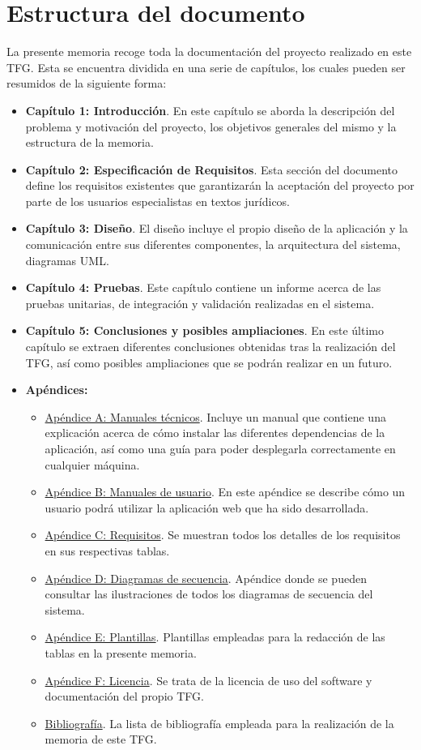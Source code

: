 \section{Estructura del documento}
La presente memoria recoge toda la documentación del proyecto realizado en este TFG. Esta se encuentra dividida en una serie de capítulos, los cuales pueden ser resumidos de la siguiente forma:
\begin{itemize}
\item {\bf Capítulo 1: Introducción}. En este capítulo se aborda la descripción del problema y motivación del proyecto, los objetivos generales del mismo y la estructura de la memoria.
\item {\bf Capítulo 2: Especificación de Requisitos}. Esta sección del documento define los requisitos existentes que garantizarán la aceptación del proyecto por parte de los usuarios especialistas en textos jurídicos.
\item {\bf Capítulo 3: Diseño}. El diseño incluye el propio diseño de la aplicación y la comunicación entre sus diferentes componentes, la arquitectura del sistema, diagramas UML.
\item {\bf Capítulo 4: Pruebas}. Este capítulo contiene un informe acerca de las pruebas unitarias, de integración y validación realizadas en el sistema.
\item {\bf Capítulo 5: Conclusiones y posibles ampliaciones}. En este último capítulo se extraen diferentes conclusiones obtenidas tras la realización del TFG, así como posibles ampliaciones que se podrán realizar en un futuro.
\item {\bf Apéndices:}
\begin{itemize}
\item \underline{Apéndice A: Manuales técnicos}. Incluye un manual que contiene una explicación acerca de cómo instalar las diferentes dependencias de la aplicación, así como una guía para poder desplegarla correctamente en cualquier máquina.
\item \underline{Apéndice B: Manuales de usuario}. En este apéndice se describe cómo un usuario podrá utilizar la aplicación web que ha sido desarrollada.
\item \underline{Apéndice C: Requisitos}. Se muestran todos los detalles de los requisitos en sus respectivas tablas.
\item \underline{Apéndice D: Diagramas de secuencia}. Apéndice donde se pueden consultar las ilustraciones de todos los diagramas de secuencia del sistema.
\item \underline{Apéndice E: Plantillas}. Plantillas empleadas para la redacción de las tablas en la presente memoria.
\item \underline{Apéndice F: Licencia}. Se trata de la licencia de uso del software y documentación del propio TFG.
\item \underline{Bibliografía}. La lista de bibliografía empleada para la realización de la memoria de este TFG.
\end{itemize}
\end{itemize}